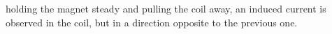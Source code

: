 holding the magnet steady and pulling the coil away, 
an induced current is observed in the coil,
but in a direction opposite to the previous one. %